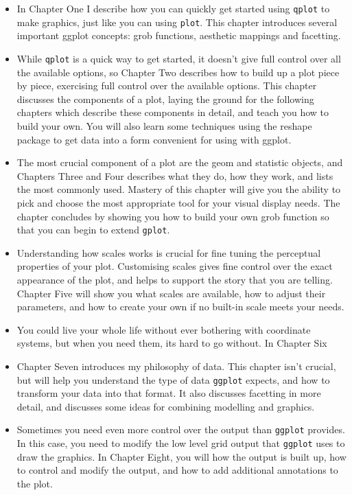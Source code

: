 \begin{itemize}
	\item In Chapter One I describe how you can quickly get started using {\tt qplot} to make graphics, just like you can using {\tt plot}.  This chapter introduces several important ggplot concepts: grob functions, aesthetic mappings and facetting.
	
	\item While {\tt qplot} is a quick way to get started, it doesn't give full control over all the  available options, so Chapter Two describes how to build up a plot piece by piece, exercising full control over the available options.  This chapter discusses the components of a plot, laying the ground for the following chapters which describe these components in detail, and teach you how to build your own.  You will also learn some techniques using the reshape package to get data into a form convenient for using with ggplot.

	\item The most crucial component of a plot are the geom and statistic objects, and Chapters Three and Four describes what they do, how they work, and lists the most commonly used.  Mastery of this chapter will give you the ability to pick and choose the most appropriate tool for your visual display needs.  The chapter concludes by showing you how to build your own grob function so that you can begin to extend {\tt gplot}.

	\item Understanding how scales works is crucial for fine tuning the perceptual properties of your plot.  Customising scales gives fine control over the exact appearance of the plot, and helps to support the story that you are telling.  Chapter Five will show you what scales are available, how to adjust their parameters, and how to create your own if no built-in scale meets your needs.

	\item You could live your whole life without ever bothering with coordinate systems, but when you need them, its hard to go without.  In Chapter Six
	
	\item Chapter Seven introduces my philosophy of data.  This chapter isn't crucial, but will help you understand the type of data {\tt ggplot} expects, and how to transform your data into that format.  It also discusses facetting in more detail, and discusses some ideas for combining modelling and graphics.
	
	\item Sometimes you need even more control over the output than {\tt ggplot} provides.  In this case, you need to modify the low level grid output that {\tt ggplot} uses to draw the graphics.  In Chapter Eight, you will how the output is built up, how to control and modify the output, and how to add additional annotations to the plot.

\end{itemize}

